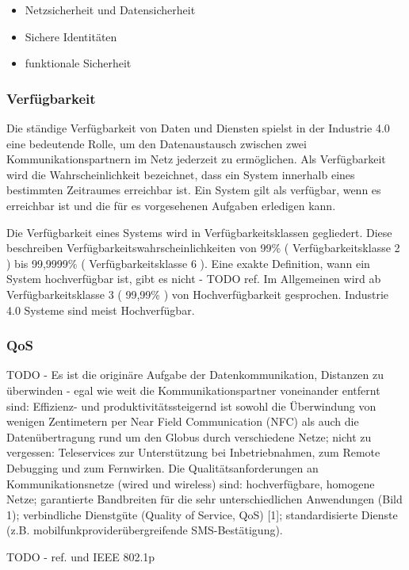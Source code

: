 \begin{itemize}
    \item Netzsicherheit und Datensicherheit
    \item Sichere Identitäten
    \item funktionale Sicherheit
\end{itemize}

\subsubsection{Verfügbarkeit}
Die ständige Verfügbarkeit von Daten und Diensten spielst in der Industrie 4.0 eine bedeutende Rolle, um den Datenaustausch zwischen zwei Kommunikationspartnern im Netz jederzeit zu ermöglichen. Als Verfügbarkeit wird die Wahrscheinlichkeit bezeichnet, dass ein System innerhalb eines bestimmten Zeitraumes erreichbar ist. Ein System gilt als verfügbar, wenn es erreichbar ist und die für es vorgesehenen Aufgaben erledigen kann.

Die Verfügbarkeit eines Systems wird in Verfügbarkeitsklassen gegliedert. Diese beschreiben Verfügbarkeitswahrscheinlichkeiten von 99\% ( Verfügbarkeitsklasse 2 ) bis 99,9999\% ( Verfügbarkeitsklasse 6 ). Eine exakte Definition, wann ein System hochverfügbar ist, gibt es nicht - TODO ref. Im Allgemeinen wird ab Verfügbarkeitsklasse 3 ( 99,99\% ) von Hochverfügbarkeit gesprochen. Industrie 4.0 Systeme sind meist Hochverfügbar.

\subsubsection{\ac{QoS}}
TODO - Es ist die originäre Aufgabe der Datenkommunikation, Distanzen zu überwinden - egal wie weit die Kommunikationspartner voneinander entfernt sind: Effizienz- und produktivitätssteigernd ist sowohl die Überwindung von wenigen Zentimetern per Near Field Communication (NFC) als auch die Datenübertragung rund um den Globus durch verschiedene Netze; nicht zu vergessen: Teleservices zur Unterstützung bei Inbetriebnahmen, zum Remote Debugging und zum Fernwirken. Die Qualitätsanforderungen an Kommunikationsnetze (wired und wireless) sind: hochverfügbare, homogene Netze; garantierte Bandbreiten für die sehr unterschiedlichen Anwendungen (Bild 1); verbindliche Dienstgüte (Quality of Service, QoS) [1]; standardisierte Dienste (z.B. mobilfunkproviderübergreifende SMS-Bestätigung). 

TODO - ref. \cite{torscht2014} und IEEE 802.1p

